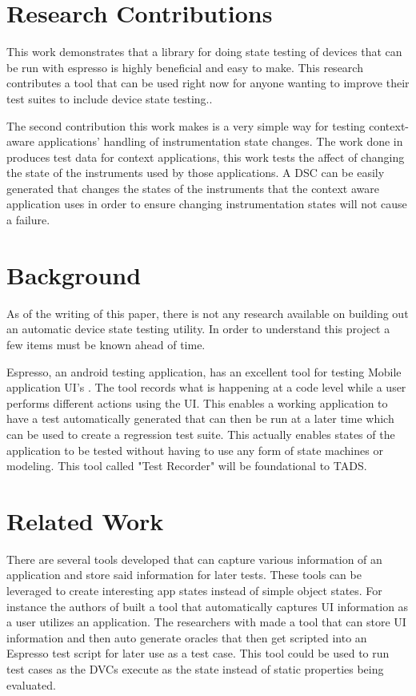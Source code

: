 \section{Research Contributions}
This work demonstrates that a library for doing state testing of devices that can be run with espresso is highly beneficial and easy to make.  This research contributes a tool that can be used right now for anyone wanting to improve their test suites to include device state testing.. 

The second contribution this work makes is a very simple way for testing context-aware applications' handling of instrumentation state changes. The work done in \cite{Luo:2017:TLT:3139486.3130945} produces test data for context applications, this work tests the affect of changing the state of the instruments used by those applications.  A DSC can be easily generated that changes the states of the instruments that the context aware application uses in order to ensure changing instrumentation states will not cause a failure. 

\section{Background}
As of the writing of this paper, there is not any research available on building out an automatic device state testing utility.  In order to understand this project a few items must be known ahead of time.  

Espresso, an android testing application, has an excellent tool for testing Mobile application UI's \cite{nolan2015agile}.  The tool records what is happening at a code level while a user performs different actions using the UI.  This enables a working application to have a test automatically generated that can then be run at a later time which can be used to create a regression test suite.  This actually enables states of the application to be tested without having to use any form of state machines or modeling.  This tool called "Test Recorder" will be foundational to TADS. 


\section{Related Work}
There are several tools developed that can capture various information of an application and store said information for later tests.  These tools can be leveraged to create interesting app states instead of simple object states.  For instance the authors of \cite{7962332} built a tool that automatically captures UI information as a user utilizes an application.  The researchers with\cite{7927971} made a tool that can store UI information and then auto generate oracles that then get scripted into an Espresso test script for later use as a test case.  This tool could be used to run test cases as the DVCs execute as the state instead of static properties being evaluated. 

